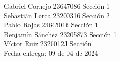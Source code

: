 \documentclass[letterpaper]{article}
\begin{document}
	\vspace*{30mm}
	\flushright 
	
	Gabriel Cornejo 23647086 Sección 1\\
	Sebastián Lorca 23200316 Sección 2\\
	Pablo Rojas	23645016 Sección 1\\
	Benjamín Sánchez 23205873 Sección 1\\
	Víctor Ruiz 2320012J Sección1\\
	
	
	\vspace*{5mm}
	{\large Fecha entrega: 09 de 04 de 2024\\}
	
	\newpage
	\begin{flushleft}
		\tableofcontents
	\end{flushleft}
	
\end{document}
